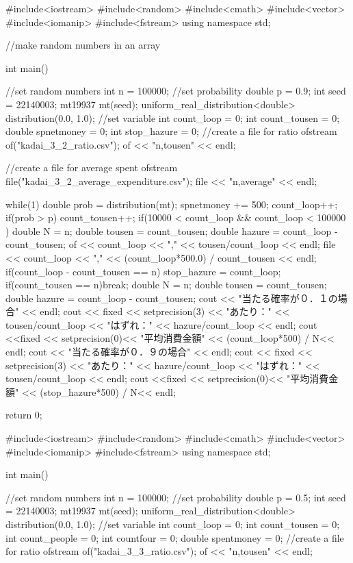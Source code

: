 \documentclass[fleqn, a4paper. 12pt]{ltjsarticle} %
\begin{document}
\begin{cppcode}
  #include<iostream>
#include<random>
#include<cmath>
#include<vector>
#include<iomanip>
#include<fstream>
using namespace std;

//make random numbers in an array


int main(){
    //set random numbers
    int n = 100000;
    //set probability
    double p = 0.9;
    int seed = 22140003;
    mt19937 mt(seed);
    uniform_real_distribution<double> distribution(0.0, 1.0);
    //set variable
    int count_loop = 0;
    int count_tousen = 0;
    double spnetmoney = 0;
    int stop_hazure = 0;
    //create a file for ratio
    ofstream of("kadai_3_2_ratio.csv");
    of << "n,tousen" << endl;

    //create a file for  average spent
    ofstream file("kadai_3_2_average_expenditure.csv");
    file << "n,average" << endl;

    
    while(1){
        double prob = distribution(mt);
        spnetmoney += 500;
        count_loop++;
        if(prob > p){
            count_tousen++;
        }
        if(10000 < count_loop && count_loop < 100000 ){
            double N = n;
            double tousen = count_tousen;
            double hazure = count_loop - count_tousen;
            of << count_loop << "," << tousen/count_loop << endl; 
            file << count_loop << "," << (count_loop*500.0) / count_tousen << endl;
        }
        if(count_loop - count_tousen == n){
            stop_hazure = count_loop;
        }
        if(count_tousen == n)break;
    }
    double N = n;
    double tousen = count_tousen;
    double hazure = count_loop - count_tousen;
    cout << "当たる確率が０．１の場合" << endl;
    cout << fixed << setprecision(3) <<  "あたり：" << tousen/count_loop << "はずれ：" << hazure/count_loop << endl;
    cout <<fixed << setprecision(0)<< "平均消費金額" << (count_loop*500) / N<< endl;
    cout << "当たる確率が０．９の場合" << endl;
    cout << fixed << setprecision(3) <<  "あたり：" << hazure/count_loop << "はずれ：" << tousen/count_loop << endl;
    cout <<fixed << setprecision(0)<< "平均消費金額" << (stop_hazure*500) / N<< endl;

    return 0;
}
#include<iostream>
#include<random>
#include<cmath>
#include<vector>
#include<iomanip>
#include<fstream>
using namespace std;


int main(){
    //set random numbers
    int n = 100000;
    //set probability
    double p = 0.5;
    int seed = 22140003;
    mt19937 mt(seed);
    uniform_real_distribution<double> distribution(0.0, 1.0);
    //set variable
    int count_loop = 0;
    int count_tousen = 0;
    int count_people = 0;
    int countfour = 0;
    double spentmoney = 0;
    //create a file for ratio
    ofstream of("kadai_3_3_ratio.csv");
    of << "n,tousen" << endl;

}
\end{cppcode}
\end{document}

